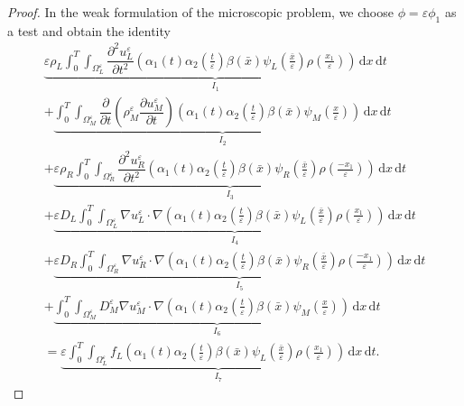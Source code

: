 \documentclass[11pt]{article}
\def\es{\varepsilon}
\def\orr{\Omega_R^\varepsilon}
\def\omm{\Omega_M^\varepsilon}
\def\oll{\Omega_L^\varepsilon}
\newcommand{\di}[1]{\,\mathrm{d}#1}
\newcommand{\B}{\textcolor{orange}}
\begin{document}
\begin{proof}
In the weak formulation of the microscopic problem, we choose $\phi=\es\phi_1$ as a test and obtain the identity
 \begin{multline}\label{eq:phi1weakform}
   \underbrace{ \es \rho_L\int_0^T\int_{\oll}  \dfrac{\partial^2u_L^\es}{\partial t^2} (\alpha_1(t)\alpha_2(\frac{t}{\es})\beta(\bar x) \psi_L(\frac{\bar x}{\es})\rho(\frac{x_1}{\es}))\di{x}\di{t}}_{I_1}\\
    +  \underbrace{\int_0^T\int_{\omm}  \dfrac{\partial}{\partial t}\left({\rho_M^\es} \dfrac{\partial u_M^\es}{\partial t}\right) ( \alpha_1(t)\alpha_2(\frac{t}{\es})\beta(\bar x) \psi_M(\frac{x}{\es}))\di{x}\di{t}}_{I_2} \\
    +   \underbrace{ \es \rho_R\int_0^T\int_{\orr} \dfrac{\partial^2u_R^\es}{\partial t^2} ( \alpha_1(t)\alpha_2(\frac{t}{\es})\beta(\bar x) \psi_R(\frac{\bar x}{\es})\rho(\frac{-x_1}{\es}))\di{x}\di{t}}_{I_3}\\
    +\underbrace{\es D_L\int_0^T\int_{\oll}\nabla u_L^\es \cdot \nabla ( \alpha_1(t)\alpha_2(\frac{t}{\es})\beta(\bar x) \psi_L(\frac{\bar x}{\es})\rho(\frac{x_1}{\es}))   \di{x}\di{t}}_{I_4}\\
    + \underbrace{\es D_R\int_0^T\int_{\orr} \nabla u_R^\es\cdot\nabla ( \alpha_1(t)\alpha_2(\frac{t}{\es})\beta(\bar x) \psi_R(\frac{\bar x}{\es})\rho(\frac{-x_1}{\es})) \di{x}\di{t}}_{I_5} \\
    +\underbrace{ \int_0^T\int_{\omm}  D_M^\es  \nabla u_M^\es\cdot\nabla (\alpha_1(t)\alpha_2(\frac{t}{\es})\beta(\bar x) \psi_M(\frac{x}{\es})) \di{x}\di{t}}_{I_6}\\
    = \underbrace{\es \int_0^T\int_{\oll} f_L(\alpha_1(t)\alpha_2(\frac{t}{\es})\beta(\bar x) \psi_L(\frac{\bar x}{\es})\rho(\frac{x_1}{\es})) \di{x}\di{t}}_{I_7}.

\end{multline}
\end{proof}
\end{document}
